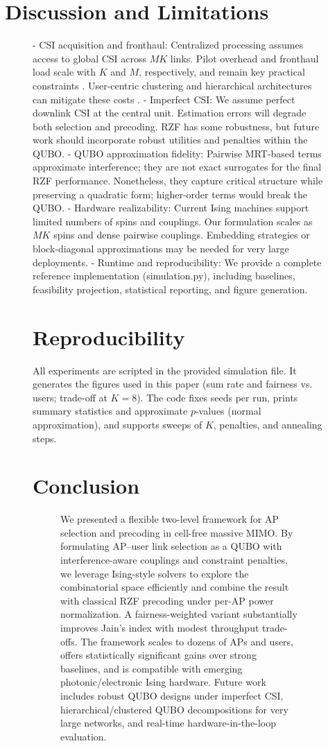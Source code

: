 \section{Discussion and Limitations}
\begin{figure}[htbp]
- CSI acquisition and fronthaul: Centralized processing assumes access to global CSI across $MK$ links. Pilot overhead and fronthaul load scale with $K$ and $M$, respectively, and remain key practical constraints \cite{bjornson2016massive,demir2021foundations}. User-centric clustering and hierarchical architectures can mitigate these costs \cite{chen2020structured}.
- Imperfect CSI: We assume perfect downlink CSI at the central unit. Estimation errors will degrade both selection and precoding. RZF has some robustness, but future work should incorporate robust utilities and penalties within the QUBO.
- QUBO approximation fidelity: Pairwise MRT-based terms approximate interference; they are not exact surrogates for the final RZF performance. Nonetheless, they capture critical structure while preserving a quadratic form; higher-order terms would break the QUBO.
- Hardware realizability: Current Ising machines support limited numbers of spins and couplings. Our formulation scales as $MK$ spins and dense pairwise couplings. Embedding strategies or block-diagonal approximations may be needed for very large deployments.
- Runtime and reproducibility: We provide a complete reference implementation (simulation.py), including baselines, feasibility projection, statistical reporting, and figure generation.

\section{Reproducibility}

All experiments are scripted in the provided simulation file. It generates the figures used in this paper (sum rate and fairness vs. users; trade-off at $K=8$). The code fixes seeds per run, prints summary statistics and approximate $p$-values (normal approximation), and supports sweeps of $K$, penalties, and annealing steps.

\section{Conclusion}
\begin{figure}[htbp]
We presented a flexible two-level framework for AP selection and precoding in cell-free massive MIMO. By formulating AP–user link selection as a QUBO with interference-aware couplings and constraint penalties, we leverage Ising-style solvers to explore the combinatorial space efficiently and combine the result with classical RZF precoding under per-AP power normalization. A fairness-weighted variant substantially improves Jain’s index with modest throughput trade-offs. The framework scales to dozens of APs and users, offers statistically significant gains over strong baselines, and is compatible with emerging photonic/electronic Ising hardware. Future work includes robust QUBO designs under imperfect CSI, hierarchical/clustered QUBO decompositions for very large networks, and real-time hardware-in-the-loop evaluation.


\end{figure}
\end{figure}
